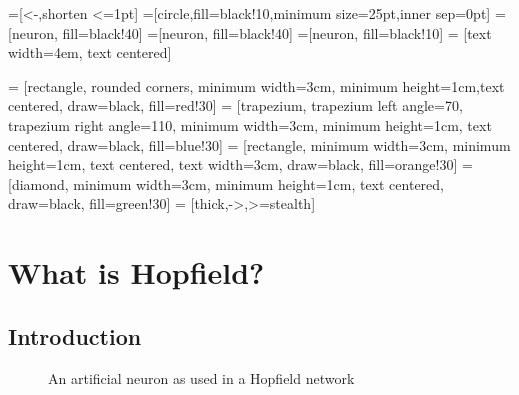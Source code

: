 \documentclass[12pt, right open]{memoir}
\begin{document}
=[<-,shorten <=1pt]
=[circle,fill=black!10,minimum size=25pt,inner sep=0pt]
=[neuron, fill=black!40]
=[neuron, fill=black!40]
=[neuron, fill=black!10]
 = [text width=4em, text centered]

 = [rectangle, rounded corners, minimum width=3cm, minimum height=1cm,text centered, draw=black, fill=red!30]
 = [trapezium, trapezium left angle=70, trapezium right angle=110, minimum width=3cm, minimum height=1cm, text centered, draw=black, fill=blue!30]
 = [rectangle, minimum width=3cm, minimum height=1cm, text centered, text width=3cm, draw=black, fill=orange!30]
 = [diamond, minimum width=3cm, minimum height=1cm, text centered, draw=black, fill=green!30]
 = [thick,->,>=stealth]


\tableofcontents

\chapter{What is Hopfield?}
\section{Introduction}

\def\layersep{2.5cm}
\begin{figure}[h!]
\caption{An artificial neuron as used in a Hopfield network} 
\label{fig:simple_hopfield_network}
\centering
{}

\end{figure}
\end{document}
